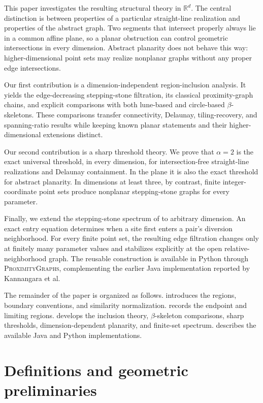 \documentclass[a4paper,fleqn]{cas-sc}
\theoremstyle{definition}
\theoremstyle{remark}
\newcommand{\R}{\mathds{R}}
\newcommand{\0}{\mathbf{0}}
\begin{document}
This paper investigates the resulting structural theory in \(\R^d\).
The central distinction is between properties of a particular straight-line
realization and properties of the abstract graph. Two segments that intersect
properly always lie in a common affine plane, so a planar obstruction can
control geometric intersections in every dimension. Abstract planarity does
not behave this way: higher-dimensional point sets may realize nonplanar
graphs without any proper edge intersections.

Our first contribution is a dimension-independent region-inclusion analysis.
It yields the edge-decreasing stepping-stone filtration, its classical
proximity-graph chains, and explicit comparisons with both lune-based and
circle-based \(\beta\)-skeletons. These comparisons transfer connectivity,
Delaunay, tiling-recovery, and spanning-ratio results while keeping known
planar statements and their higher-dimensional extensions distinct.

Our second contribution is a sharp threshold theory. We prove that
\(\alpha=2\) is the exact universal threshold, in every dimension, for
intersection-free straight-line realizations and Delaunay containment. In the
plane it is also the exact threshold for abstract planarity. In dimensions at
least three, by contrast, finite integer-coordinate point sets produce
nonplanar stepping-stone graphs for every parameter.

Finally, we extend the stepping-stone spectrum of
\citet{kannangara2018stepping} to arbitrary dimension. An exact entry
equation determines when a site first enters a pair's diversion neighborhood.
For every finite point set, the resulting edge filtration changes only at
finitely many parameter values and stabilizes explicitly at the open
relative-neighborhood graph. The reusable construction is available in
Python through \textsc{ProximityGraphs}, complementing the earlier Java
implementation reported by Kannangara et al.

The remainder of the paper is organized as follows.
 introduces the regions, boundary conventions, and
similarity normalization.
 records the endpoint and limiting regions.
 develops the inclusion theory,
\(\beta\)-skeleton comparisons, sharp thresholds, dimension-dependent
planarity, and finite-set spectrum.
 describes the available Java and Python
implementations.

\section{Definitions and geometric preliminaries}
\label{sec:geometry}
\end{document}
